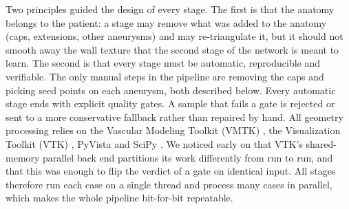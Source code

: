 Two principles guided the design of every stage. The first is that the anatomy belongs to the patient: a stage may remove what was added to the anatomy (caps, extensions, other aneurysms) and may re-triangulate it, but it should not smooth away the wall texture that the second stage of the network is meant to learn. The second is that every stage must be automatic, reproducible and verifiable. The only manual steps in the pipeline are removing the caps and picking seed points on each aneurysm, both described below. Every automatic stage ends with explicit quality gates. A sample that fails a gate is rejected or sent to a more conservative fallback rather than repaired by hand. All geometry processing relies on the Vascular Modeling Toolkit (VMTK) \citep{antiga2008,izzo2018}, the Visualization Toolkit (VTK) \citep{schroeder2006}, PyVista \citep{sullivan2019} and SciPy \citep{virtanen2020}. We noticed early on that VTK's shared-memory parallel back end partitions its work differently from run to run, and that this was enough to flip the verdict of a gate on identical input. All stages therefore run each case on a single thread and process many cases in parallel, which makes the whole pipeline bit-for-bit repeatable.

